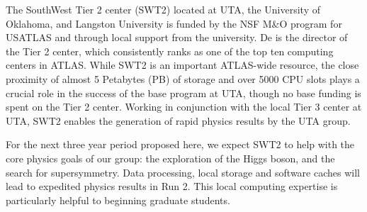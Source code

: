 
The SouthWest Tier 2 center (SWT2) located at UTA, the University of Oklahoma, and Langston University is  
funded by the NSF M\&O program for USATLAS and through local support from the university. 
De is the director of the Tier 2 center, which consistently ranks as one of the top ten 
computing centers in ATLAS. While SWT2 is an important ATLAS-wide resource, the close 
proximity of almost 5 Petabytes (PB) of storage and over 5000 CPU slots plays a crucial 
role in the success of the base program at UTA, though no base funding is spent on the 
Tier 2 center. Working in conjunction with the local Tier 3 center at UTA, SWT2 enables 
the generation of rapid physics results by the UTA group.

For the next three year period proposed here, we expect SWT2 to help with the core physics 
goals of our group: the exploration of the Higgs boson, and the search for supersymmetry. 
Data processing, local storage and software caches will lead to expedited physics results 
in Run 2. This local computing expertise is particularly helpful to beginning graduate students.
